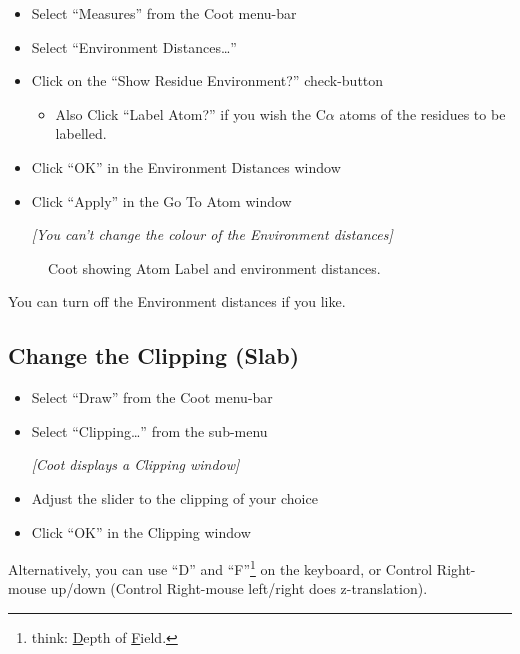 \documentclass{article}
\begin{document}
\begin{itemize}
  \begin{itemize}
  \item Select \textsf{``Measures''} from the Coot menu-bar
  \item Select \textsf{``Environment Distances\ldots''}
  \item Click on the \textsf{``Show Residue Environment?''} check-button
    \begin{itemize}
    \item Also Click \textsf{``Label Atom?''} if you wish the
      C$\alpha$ atoms of the residues to be labelled.
    \end{itemize}
  \item Click \textsf{``OK''} in the Environment Distances window
  \item Click \textsf{``Apply''} in the Go To Atom window

    \emph{[You can't change the colour of the Environment distances]}
  \end{itemize}

  \begin{figure}[htbp]
    \begin{center}
      \leavevmode
      \epsfxsize 70mm
      \caption{Coot showing Atom Label and environment distances.}
      \label{fig:environment}
    \end{center}
  \end{figure}
\end{itemize}

You can turn off the Environment distances if you like.

\subsection{Change the Clipping (Slab)}

\begin{itemize}
\item Select \textsf{``Draw''} from the Coot menu-bar
\item Select \textsf{``Clipping\ldots''} from the sub-menu

\textsl{ [Coot displays a Clipping window]}

\item Adjust the slider to the clipping of your choice
\item Click \textsf{``OK''} in the Clipping window
\end{itemize}

Alternatively, you can use ``D'' and ``F''\footnote{think:
  \underline{D}epth of \underline{F}ield.} on the keyboard, or Control
Right-mouse up/down (Control Right-mouse left/right does
z-translation).
\end{document}

